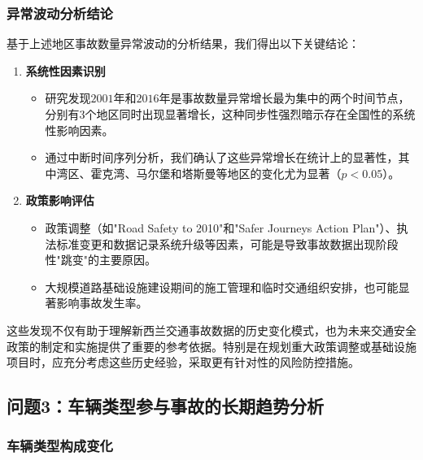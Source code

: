 \documentclass[12pt,a4paper]{article}
\begin{document}
\subsubsection{异常波动分析结论}

基于上述地区事故数量异常波动的分析结果，我们得出以下关键结论：

\begin{enumerate}
\item \textbf{系统性因素识别}
   \begin{itemize}
   \item 研究发现$2001$年和$2016$年是事故数量异常增长最为集中的两个时间节点，分别有3个地区同时出现显著增长，这种同步性强烈暗示存在全国性的系统性影响因素。
   \item 通过中断时间序列分析，我们确认了这些异常增长在统计上的显著性，其中湾区、霍克湾、马尔堡和塔斯曼等地区的变化尤为显著（$p<0.05$）。
   \end{itemize}

\item \textbf{政策影响评估}
   \begin{itemize}
   \item 政策调整（如"Road Safety to 2010"和"Safer Journeys Action Plan"）、执法标准变更和数据记录系统升级等因素，可能是导致事故数据出现阶段性"跳变"的主要原因。
   \item 大规模道路基础设施建设期间的施工管理和临时交通组织安排，也可能显著影响事故发生率。
   \end{itemize}
\end{enumerate}

这些发现不仅有助于理解新西兰交通事故数据的历史变化模式，也为未来交通安全政策的制定和实施提供了重要的参考依据。特别是在规划重大政策调整或基础设施项目时，应充分考虑这些历史经验，采取更有针对性的风险防控措施。

\subsection{问题3：车辆类型参与事故的长期趋势分析}

\subsubsection{车辆类型构成变化}
\end{document}
